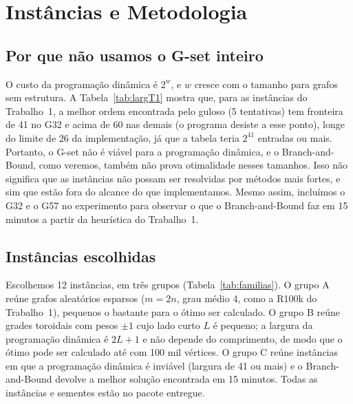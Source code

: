 \section{Instâncias e Metodologia}\label{sec:instancias}

\subsection{Por que não usamos o G-set inteiro}

O custo da programação dinâmica é $2^{w}$, e $w$ cresce com o tamanho para grafos sem estrutura. A Tabela~\ref{tab:largT1} mostra que, para as instâncias do Trabalho~1, a melhor ordem encontrada pelo guloso (5 tentativas) tem fronteira de 41 no G32 e acima de 60 nas demais (o programa desiste a esse ponto), longe do limite de 26 da implementação, já que a tabela teria $2^{41}$ entradas ou mais. Portanto, o G-set não é viável para a programação dinâmica, e o Branch-and-Bound, como veremos, também não prova otimalidade nesses tamanhos. Isso não significa que as instâncias não possam ser resolvidas por métodos mais fortes, e sim que estão fora do alcance do que implementamos. Mesmo assim, incluímos o G32 e o G57 no experimento para observar o que o Branch-and-Bound faz em 15 minutos a partir da heurística do Trabalho~1.



\subsection{Instâncias escolhidas}

Escolhemos 12 instâncias, em três grupos (Tabela~\ref{tab:familias}). O grupo A reúne grafos aleatórios esparsos ($m=2n$, grau médio 4, como a R100k do Trabalho~1), pequenos o bastante para o ótimo ser calculado. O grupo B reúne grades toroidais com pesos $\pm1$ cujo lado curto $L$ é pequeno; a largura da programação dinâmica é $2L+1$ e não depende do comprimento, de modo que o ótimo pode ser calculado até com 100 mil vértices. O grupo C reúne instâncias em que a programação dinâmica é inviável (largura de 41 ou mais) e o Branch-and-Bound devolve a melhor solução encontrada em 15 minutos. Todas as instâncias e sementes estão no pacote entregue.

